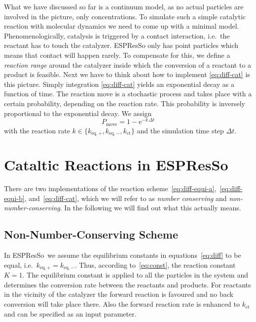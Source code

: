 \documentclass[aip,jcp,reprint,a4paper,onecolumn,nofootinbib,amsmath,amssymb]{revtex4-1}
\newcommand{\es}{\mbox{\textsf{ESPResSo}}\xspace}
\begin{document}
What we have discussed so far is a continuum model, as no actual
particles are involved in the picture, only concentrations.  To
simulate such a simple catalytic reaction with molecular dynamics we
need to come up with a minimal model.  Phenomenologically, catalysis
is triggered by a contact interaction, i.e.~the reactant has to touch
the catalyzer.  \es{} only has point particles which means that
contact will happen rarely.  To compensate for this, we define a
\emph{reaction range} around the catalyzer inside which the conversion
of a reactant to a product is feasible.  Next we have to think about
how to implement \eqref{eq:diff-cat} is this picture.  Simply
integration \eqref{eq:diff-cat} yields an exponential decay as a
function of time.  The reaction move is a stochastic process and takes
place with a certain probability, depending on the reaction rate.
This probability is inversely proportional to the exponential decay.
We assign
\begin{equation}
  \label{eq:prob}
  P_{\text{move}} = 1 - \mathrm{e}^{-k\,\Delta t}
\end{equation}
with the reaction rate $k \in \{ k_{\text{eq},+}, k_{\text{eq},-},
k_{\text{ct}} \}$ and the simulation time step $\Delta t$.

\section{Cataltic Reactions in \es}

There are two implementations of the reaction
scheme~\eqref{eq:diff-equi-a},~\eqref{eq:diff-equi-b},
and~\eqref{eq:diff-cat}, which we will refer to as \emph{number
  conserving} and \emph{non-number-conserving}.  In the following we
will find out what this actually means.

\subsection{Non-Number-Conserving Scheme}

In \es\ we assume the equilibrium constants in
equations~\eqref{eq:diff} to be equal, i.e.~$k_{\text{eq},+} =
k_{\text{eq},-}$.  Thus, according to~\eqref{eq:const}, the reaction
constant $K = 1$.  The equilibrium constant is applied to all the
particles in the system and determines the conversion rate between the
reactants and products.  For reactants in the vicinity of the
catalyzer the forward reaction is favoured and no back conversion will
take place there.  Also the forward reaction rate is enhanced to
$k_{\text{ct}}$ and can be specified as an input parameter.
\end{document}
